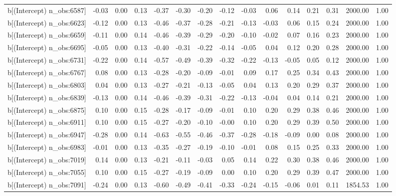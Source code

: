 \begin{table}[ht]
\begin{tabular}{rrrrrrrrrrrrrrr}
  b[(Intercept) n\_obs:6587] & -0.03 & 0.00 & 0.13 & -0.37 & -0.30 & -0.20 & -0.12 & -0.03 & 0.06 & 0.14 & 0.21 & 0.31 & 2000.00 & 1.00 \\ 
  b[(Intercept) n\_obs:6623] & -0.12 & 0.00 & 0.13 & -0.46 & -0.37 & -0.28 & -0.21 & -0.13 & -0.03 & 0.06 & 0.15 & 0.24 & 2000.00 & 1.00 \\ 
  b[(Intercept) n\_obs:6659] & -0.11 & 0.00 & 0.14 & -0.46 & -0.39 & -0.29 & -0.20 & -0.10 & -0.02 & 0.07 & 0.16 & 0.23 & 2000.00 & 1.00 \\ 
  b[(Intercept) n\_obs:6695] & -0.05 & 0.00 & 0.13 & -0.40 & -0.31 & -0.22 & -0.14 & -0.05 & 0.04 & 0.12 & 0.20 & 0.28 & 2000.00 & 1.00 \\ 
  b[(Intercept) n\_obs:6731] & -0.22 & 0.00 & 0.14 & -0.57 & -0.49 & -0.39 & -0.32 & -0.22 & -0.13 & -0.05 & 0.05 & 0.12 & 2000.00 & 1.00 \\ 
  b[(Intercept) n\_obs:6767] & 0.08 & 0.00 & 0.13 & -0.28 & -0.20 & -0.09 & -0.01 & 0.09 & 0.17 & 0.25 & 0.34 & 0.43 & 2000.00 & 1.00 \\ 
  b[(Intercept) n\_obs:6803] & 0.04 & 0.00 & 0.13 & -0.27 & -0.21 & -0.13 & -0.05 & 0.04 & 0.13 & 0.20 & 0.29 & 0.37 & 2000.00 & 1.00 \\ 
  b[(Intercept) n\_obs:6839] & -0.13 & 0.00 & 0.14 & -0.46 & -0.39 & -0.31 & -0.22 & -0.13 & -0.04 & 0.04 & 0.14 & 0.21 & 2000.00 & 1.00 \\ 
  b[(Intercept) n\_obs:6875] & 0.10 & 0.00 & 0.15 & -0.28 & -0.17 & -0.09 & -0.01 & 0.10 & 0.20 & 0.29 & 0.38 & 0.46 & 2000.00 & 1.00 \\ 
  b[(Intercept) n\_obs:6911] & 0.10 & 0.00 & 0.15 & -0.27 & -0.20 & -0.10 & -0.00 & 0.10 & 0.20 & 0.29 & 0.39 & 0.50 & 2000.00 & 1.00 \\ 
  b[(Intercept) n\_obs:6947] & -0.28 & 0.00 & 0.14 & -0.63 & -0.55 & -0.46 & -0.37 & -0.28 & -0.18 & -0.09 & 0.00 & 0.08 & 2000.00 & 1.00 \\ 
  b[(Intercept) n\_obs:6983] & -0.01 & 0.00 & 0.13 & -0.35 & -0.27 & -0.19 & -0.10 & -0.01 & 0.08 & 0.15 & 0.25 & 0.33 & 2000.00 & 1.00 \\ 
  b[(Intercept) n\_obs:7019] & 0.14 & 0.00 & 0.13 & -0.21 & -0.11 & -0.03 & 0.05 & 0.14 & 0.22 & 0.30 & 0.38 & 0.46 & 2000.00 & 1.00 \\ 
  b[(Intercept) n\_obs:7055] & 0.10 & 0.00 & 0.15 & -0.27 & -0.19 & -0.09 & 0.00 & 0.10 & 0.20 & 0.29 & 0.39 & 0.47 & 2000.00 & 1.00 \\ 
  b[(Intercept) n\_obs:7091] & -0.24 & 0.00 & 0.13 & -0.60 & -0.49 & -0.41 & -0.33 & -0.24 & -0.15 & -0.06 & 0.01 & 0.11 & 1854.53 & 1.00 \\ 

\end{tabular}
\end{table}
